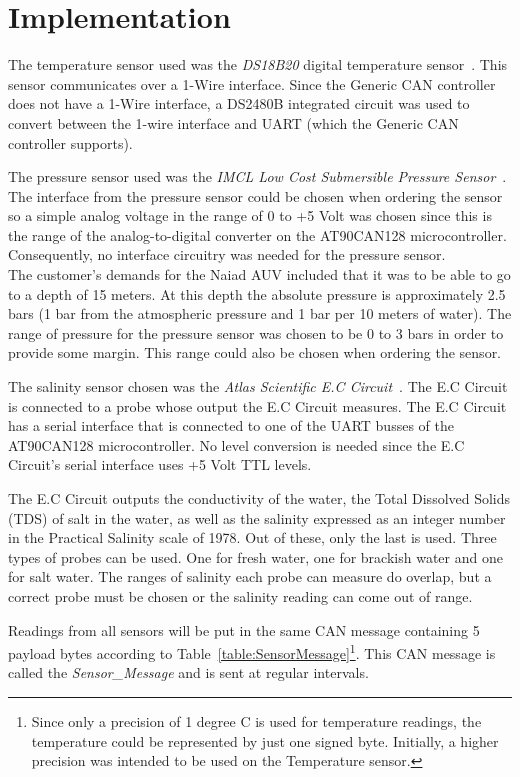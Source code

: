 
\section{Implementation}\label{sec:implementation}
The temperature sensor used was the \emph{DS18B20} digital temperature sensor~\cite{web:ds18b20}. This sensor communicates over a 1-Wire interface. Since the Generic CAN controller does not have a 1-Wire interface, a DS2480B integrated circuit was used to convert between the 1-wire interface and UART (which the Generic CAN controller supports).

The pressure sensor used was the \emph{IMCL Low Cost Submersible Pressure Sensor}~\cite{web:imcl}. The interface from the pressure sensor could be chosen when ordering the sensor so a simple analog voltage in the range of 0 to +5 Volt was chosen since this is the range of the analog-to-digital converter on the AT90CAN128 microcontroller. Consequently, no interface circuitry was needed for the pressure sensor.\\
The customer's demands for the Naiad AUV included that it was to be able to go to a depth of 15 meters. At this depth the absolute pressure is approximately 2.5 bars (1 bar from the atmospheric pressure and 1 bar per 10 meters of water). The range of pressure for the pressure sensor was chosen to be 0 to 3 bars in order to provide some margin. This range could also be chosen when ordering the sensor.

The salinity sensor chosen was the \emph{Atlas Scientific E.C Circuit}~\cite{web:ec_circuit}. The E.C Circuit is connected to a probe whose output the E.C Circuit measures. The E.C Circuit has a serial interface that is connected to one of the UART busses of the AT90CAN128 microcontroller. No level conversion is needed since the E.C Circuit's serial interface uses +5 Volt TTL levels.

The E.C Circuit outputs the conductivity of the water, the Total Dissolved Solids (TDS) of salt in the water, as well as the salinity expressed as an integer number in the Practical Salinity scale of 1978. Out of these, only the last is used. \newline
Three types of probes can be used. One for fresh water, one for brackish water and one for salt water. The ranges of salinity each probe can measure do overlap, but a correct probe must be chosen or the salinity reading can come out of range. 

Readings from all sensors will be put in the same CAN message containing 5 payload bytes according to Table~\ref{table:SensorMessage}\footnote{Since only a precision of 1 degree C is used for temperature readings, the temperature could be represented by just one signed byte. Initially, a higher precision was intended to be used on the Temperature sensor.}. This CAN message is called the \emph{Sensor\_Message} and is sent at regular intervals.

